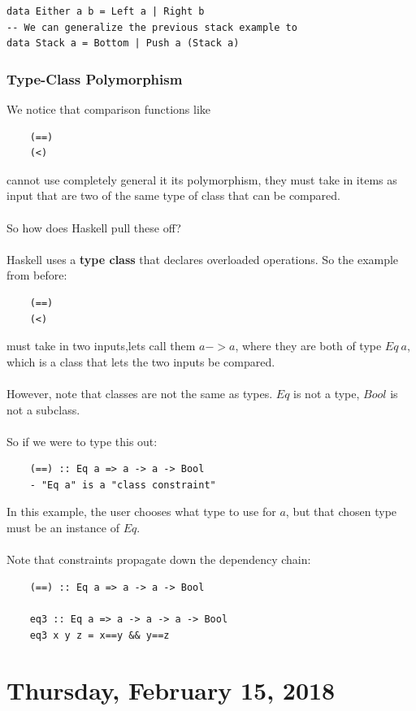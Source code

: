 \documentclass[12pt]{article}
\begin{document}
\begin{lstlisting}
data Either a b = Left a | Right b
-- We can generalize the previous stack example to
data Stack a = Bottom | Push a (Stack a)
\end{lstlisting}

\subsubsection{Type-Class Polymorphism}

We notice that comparison functions like
\begin{lstlisting}
	(==)
	(<)
\end{lstlisting}
cannot use completely general it its polymorphism, they must take in items as input that are two of the same type of class that can be compared.\\
\\
So how does Haskell pull these off?\\
\\
Haskell uses a \textbf{type class} that declares overloaded operations. So the example from before:
\begin{lstlisting}
	(==)
	(<)
\end{lstlisting}
must take in two inputs,lets call them $a->a$, where they are both of type $Eq\: a$, which is a class that lets the two inputs be compared.\\
\\
However, note that classes are not the same as types. $Eq$ is not a type, $Bool$ is not a subclass.\\
\\
So if we were to type this out:
\begin{lstlisting}
	(==) :: Eq a => a -> a -> Bool
	- "Eq a" is a "class constraint"
\end{lstlisting}
In this example, the user chooses what type to use for $a$, but that chosen type must be an instance of $Eq$.\\
\\
Note that constraints propagate down the dependency chain:
\begin{lstlisting}
	(==) :: Eq a => a -> a -> Bool
	
	eq3 :: Eq a => a -> a -> a -> Bool
	eq3 x y z = x==y && y==z
\end{lstlisting}

\newpage

\section{Thursday, February 15, 2018}
\end{document}

